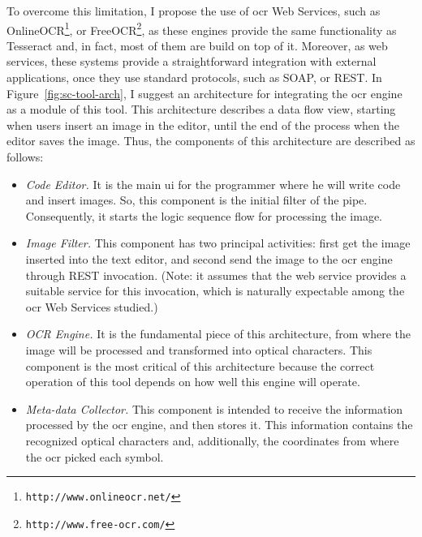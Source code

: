 To overcome this limitation, I propose the use of \gls{ocr} Web Services, such as OnlineOCR\footnote{\texttt{http://www.onlineocr.net/}}, or FreeOCR\footnote{\texttt{http://www.free-ocr.com/}}, as these engines provide the same functionality as Tesseract and, in fact, most of them are build on top of it. Moreover, as web services, these systems provide a straightforward integration with external applications, once they use standard protocols, such as SOAP, or REST. In Figure~\ref{fig:sc-tool-arch}, I suggest an architecture for integrating the \gls{ocr} engine as a module of this tool. This architecture describes a data flow view, starting when users insert an image in the editor, until the end of the process when the editor saves the image. Thus, the components of this architecture are described as follows:

\begin{itemize}
\item \textit{Code Editor.} It is the main \gls{ui} for the programmer where he will write code and insert images. So, this component is the initial filter of the pipe. Consequently, it starts the logic sequence flow for processing the image.

\item \textit{Image Filter.} This component has two principal activities: first get the image inserted into the text editor, and second send the image to the \gls{ocr} engine through REST invocation. (Note: it assumes that the web service provides a suitable service for this invocation, which is naturally expectable among the \gls{ocr} Web Services studied.)

\item \textit{OCR Engine.} It is the fundamental piece of this architecture, from where the image will be processed and transformed into optical characters. This component is the most critical of this architecture because the correct operation of this tool depends on how well this engine will operate.

\item \textit{Meta-data Collector.} This component is intended to receive the information processed by the \gls{ocr} engine, and then stores it. This information contains the recognized optical characters and, additionally, the coordinates from where the \gls{ocr} picked each symbol. 
\end{itemize}

